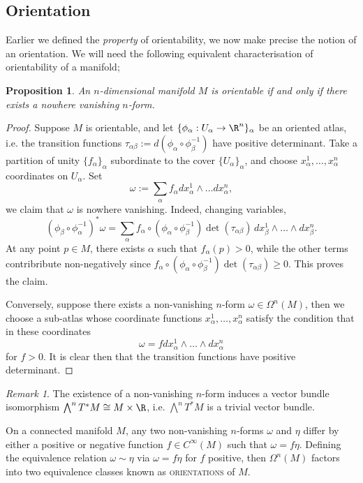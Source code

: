 \documentclass[reqno]{amsart}
\newtheorem{proposition}[theorem]{Proposition}
\theoremstyle{definition}
\theoremstyle{remark}
\newtheorem*{remark}{Remark}
\renewcommand{\emph}{\textsc}
\begin{document}
\subsection{Orientation}

Earlier we defined the \textit{property} of orientability, we now make precise the notion of an orientation. We will need the following equivalent characterisation of orientability of a manifold;

\begin{proposition}
	An $n$-dimensional manifold $M$ is orientable if and only if there exists a nowhere vanishing $n$-form. 
\end{proposition}

\begin{proof}
	Suppose $M$ is orientable, and let $\{ \phi_\alpha: U_\alpha \to \R^n \}_\alpha$ be an oriented atlas, i.e. the transition functions $\tau_{\alpha \beta} := d(\phi_\alpha \circ \phi_\beta^{-1})$ have positive determinant. Take a partition of unity $\{f_\alpha\}_\alpha$ subordinate to the cover $\{U_\alpha \}_\alpha$, and choose $x^1_\alpha, \dots, x^n_\alpha$ coordinates on $U_\alpha$. Set
		\[ \omega := \sum_\alpha f_\alpha dx^1_\alpha \wedge \dots dx^n_\alpha, \]
	we claim that $\omega$ is nowhere vanishing. Indeed, changing variables, 
		\[ (\phi_\beta \circ \phi_\alpha^{-1})^* \omega = \sum_\alpha f_\alpha \circ (\phi_\alpha \circ \phi_\beta^{-1}) \det (\tau_{\alpha \beta}) \, dx^1_\beta \wedge \dots \wedge dx^n_\beta. \]	
	At any point $p \in M$, there exists $\alpha$ such that $f_\alpha (p) > 0$, while the other terms contribribute non-negatively since $f_\alpha \circ (\phi_\alpha \circ \phi_\beta^{-1}) \det (\tau_{\alpha \beta})  \geq 0$. This proves the claim. 
		
	Conversely, suppose there exists a non-vanishing $n$-form $\omega \in \Omega^n (M)$, then we choose a sub-atlas whose coordinate functions $x^1_\alpha, \dots, x^n_\alpha$ satisfy the condition that in these coordinates
		\[ \omega = f dx^1_\alpha \wedge \dots \wedge dx^n_\alpha\]
	for $f > 0$. It is clear then that the transition functions have positive determinant. 	
\end{proof}

\begin{remark}
	The existence of a non-vanishing $n$-form induces a vector bundle isomorphism $\bigwedge^n T^* M \cong M \times \R$, i.e. $\bigwedge^n T^* M$ is a trivial vector bundle. 
\end{remark}

On a connected manifold $M$, any two non-vanishing $n$-forms $\omega$ and $\eta$ differ by either a positive or negative function $f \in C^\infty (M)$ such that $\omega = f \eta$. Defining the equivalence relation $\omega \sim \eta$ via $\omega = f \eta$ for $f$ positive, then $\Omega^n (M)$ factors into two equivalence classes known as \emph{orientations} of $M$. 
\end{document}
